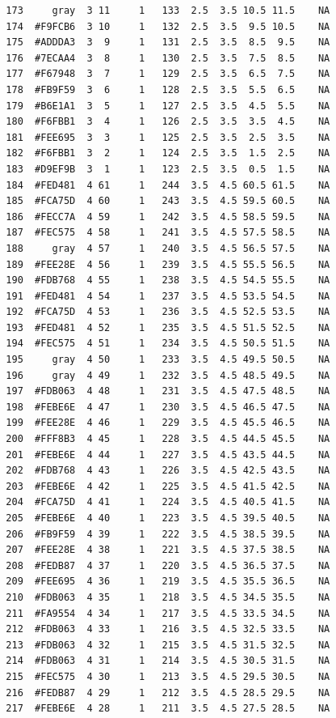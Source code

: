 \documentclass[12pt,twoside]{reedthesis}
\begin{document}
\begin{verbatim}
  173     gray  3 11     1   133  2.5  3.5 10.5 11.5    NA
  174  #F9FCB6  3 10     1   132  2.5  3.5  9.5 10.5    NA
  175  #ADDDA3  3  9     1   131  2.5  3.5  8.5  9.5    NA
  176  #7ECAA4  3  8     1   130  2.5  3.5  7.5  8.5    NA
  177  #F67948  3  7     1   129  2.5  3.5  6.5  7.5    NA
  178  #FB9F59  3  6     1   128  2.5  3.5  5.5  6.5    NA
  179  #B6E1A1  3  5     1   127  2.5  3.5  4.5  5.5    NA
  180  #F6FBB1  3  4     1   126  2.5  3.5  3.5  4.5    NA
  181  #FEE695  3  3     1   125  2.5  3.5  2.5  3.5    NA
  182  #F6FBB1  3  2     1   124  2.5  3.5  1.5  2.5    NA
  183  #D9EF9B  3  1     1   123  2.5  3.5  0.5  1.5    NA
  184  #FED481  4 61     1   244  3.5  4.5 60.5 61.5    NA
  185  #FCA75D  4 60     1   243  3.5  4.5 59.5 60.5    NA
  186  #FECC7A  4 59     1   242  3.5  4.5 58.5 59.5    NA
  187  #FEC575  4 58     1   241  3.5  4.5 57.5 58.5    NA
  188     gray  4 57     1   240  3.5  4.5 56.5 57.5    NA
  189  #FEE28E  4 56     1   239  3.5  4.5 55.5 56.5    NA
  190  #FDB768  4 55     1   238  3.5  4.5 54.5 55.5    NA
  191  #FED481  4 54     1   237  3.5  4.5 53.5 54.5    NA
  192  #FCA75D  4 53     1   236  3.5  4.5 52.5 53.5    NA
  193  #FED481  4 52     1   235  3.5  4.5 51.5 52.5    NA
  194  #FEC575  4 51     1   234  3.5  4.5 50.5 51.5    NA
  195     gray  4 50     1   233  3.5  4.5 49.5 50.5    NA
  196     gray  4 49     1   232  3.5  4.5 48.5 49.5    NA
  197  #FDB063  4 48     1   231  3.5  4.5 47.5 48.5    NA
  198  #FEBE6E  4 47     1   230  3.5  4.5 46.5 47.5    NA
  199  #FEE28E  4 46     1   229  3.5  4.5 45.5 46.5    NA
  200  #FFF8B3  4 45     1   228  3.5  4.5 44.5 45.5    NA
  201  #FEBE6E  4 44     1   227  3.5  4.5 43.5 44.5    NA
  202  #FDB768  4 43     1   226  3.5  4.5 42.5 43.5    NA
  203  #FEBE6E  4 42     1   225  3.5  4.5 41.5 42.5    NA
  204  #FCA75D  4 41     1   224  3.5  4.5 40.5 41.5    NA
  205  #FEBE6E  4 40     1   223  3.5  4.5 39.5 40.5    NA
  206  #FB9F59  4 39     1   222  3.5  4.5 38.5 39.5    NA
  207  #FEE28E  4 38     1   221  3.5  4.5 37.5 38.5    NA
  208  #FEDB87  4 37     1   220  3.5  4.5 36.5 37.5    NA
  209  #FEE695  4 36     1   219  3.5  4.5 35.5 36.5    NA
  210  #FDB063  4 35     1   218  3.5  4.5 34.5 35.5    NA
  211  #FA9554  4 34     1   217  3.5  4.5 33.5 34.5    NA
  212  #FDB063  4 33     1   216  3.5  4.5 32.5 33.5    NA
  213  #FDB063  4 32     1   215  3.5  4.5 31.5 32.5    NA
  214  #FDB063  4 31     1   214  3.5  4.5 30.5 31.5    NA
  215  #FEC575  4 30     1   213  3.5  4.5 29.5 30.5    NA
  216  #FEDB87  4 29     1   212  3.5  4.5 28.5 29.5    NA
  217  #FEBE6E  4 28     1   211  3.5  4.5 27.5 28.5    NA

\end{verbatim}
\end{document}
